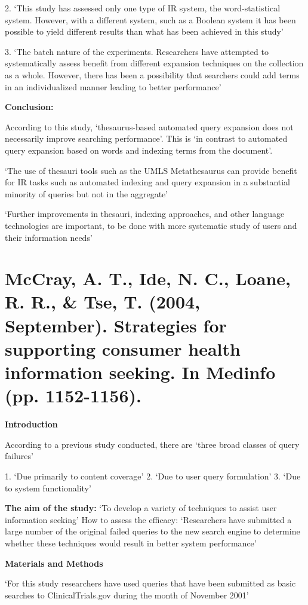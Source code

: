 \documentclass[]{article}
\begin{document}
{{2.	‘This study has assessed only one type of IR system, the word-statistical system. However, with a different system, such as a Boolean system it has been possible to yield different results than what has been achieved in this study’

3.	‘The batch nature of the experiments. Researchers have attempted to systematically assess benefit from different expansion techniques on the collection as a whole. However, there has been a possibility that searchers could add terms in an individualized manner leading to better performance’

\textbf{Conclusion:}

According to this study, ‘thesaurus-based automated query expansion does not necessarily improve searching performance’. This is ‘in contrast to automated query expansion based on words and indexing terms from the document’.

‘The use of thesauri tools such as the UMLS Metathesaurus can provide benefit for IR tasks such as automated indexing and query expansion in a substantial minority of queries but not in the aggregate’
 
‘Further improvements in thesauri, indexing approaches, and other language technologies are important, to be done with more systematic study of users and their information needs’

\section{McCray, A. T., Ide, N. C., Loane, R. R., & Tse, T. (2004, September). Strategies for supporting consumer health information seeking. In Medinfo (pp. 1152-1156).}

\textbf{Introduction}

According to a previous study conducted, there are ‘three broad classes of query failures’

1.	‘Due primarily to content coverage’
2.	‘Due to user query formulation’
3.	‘Due to system functionality’

\textbf{The aim of the study:} ‘To develop a variety of techniques to assist user information seeking’
How to assess the efficacy: ‘Researchers have submitted a large number of the original failed queries to the new search engine to determine whether these techniques would result in better system performance’

\textbf{Materials and Methods}

‘For this study researchers have used queries that have been submitted as basic searches to ClinicalTrials.gov during the month of November 2001’

}}
\end{document}
